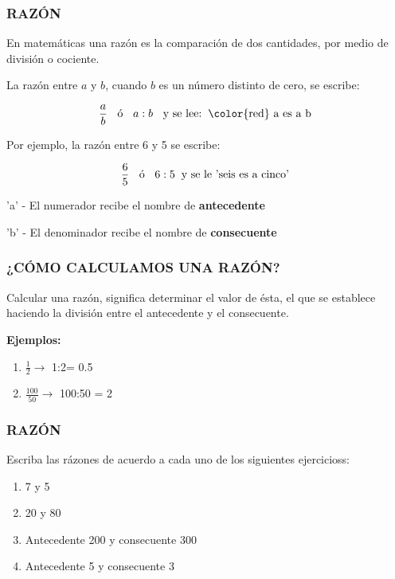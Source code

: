 \begin{frame}
    \frametitle{RAZÓN}

En matemáticas una razón es la comparación de dos cantidades, por medio de división o cociente. 

\hfill

La razón entre $a$ y $b$, cuando $b$ es un número distinto de 
cero, se escribe:

$$
\frac{a}{b} \hspace{2mm} \text{ ó } \hspace{2mm} a:b \hspace{2mm} \text{ y se lee:} \hspace{2mm}  \text{{\color{red} a es a b }}
$$

Por ejemplo, la razón entre 6 y 5 se escribe:

$$
\frac{6}{5} \hspace{2mm}  \text{ ó } \hspace{2mm} 6:5 \hspace{2mm}  \text{y se le 'seis es a cinco' }
$$

{\color{red} 'a'} - El numerador recibe el nombre de {\color{red} \textbf{antecedente}}

\hfill

{\color{red} 'b'} - El denominador recibe el nombre de {\color{red} \textbf{consecuente}}

\end{frame}


\begin{frame}
    \frametitle{¿CÓMO CALCULAMOS UNA RAZÓN?}

Calcular una razón, significa determinar el valor de ésta, el que se establece haciendo la división
entre el antecedente y el consecuente.

\hfill

\textbf{Ejemplos:}

\hfill

\begin{enumerate}
\item $\frac{1}{2} \to $ 1:2= 0.5 
\item $\frac{100}{50} \to $ 100:50 = 2
\end{enumerate}

\end{frame}


\begin{frame}
    \frametitle{RAZÓN}

Escriba las rázones de acuerdo a cada uno de los siguientes ejercicioss:

\begin{enumerate}
\item 7 y 5
\item 20 y 80
\item Antecedente 200 y consecuente 300
\item Antecedente 5 y consecuente 3
\end{enumerate}

\end{frame}


